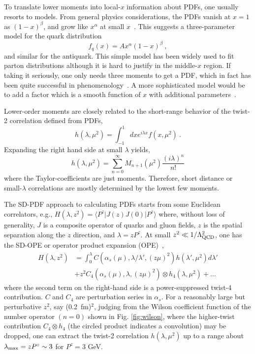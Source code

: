 \documentclass[prd,aps,twocolumn,preprintnumbers,showpacs,nofootinbib,superscriptaddress,notitlepage]{revtex4-2}
\begin{document}
To translate lower moments into local-$x$ information about PDFs, one usually resorts to models. From general 
physics considerations, the PDFs
vanish at $x=1$ as $(1-x)^\beta$, and
grow like $x^\alpha$ at small $x$~\cite{Ioffe:1985ep}. This suggests a  three-parameter model for the quark distribution 
\begin{equation}
   f_q(x) = Ax^\alpha(1-x)^\beta \ , 
\end{equation}
and similar for the antiquark. This simple model has been widely used to fit parton distributions although it is hard to justify  in the middle-$x$ region. If taking it seriously, one only needs three moments to get a PDF, which in fact has been quite successful in phenomenology~\cite{Detmold:2003tm,Alexandrou:2021mmi}. A more sophisticated model would be to add a factor which is a smooth function of $x$ with additional parameters~\cite{Dulat:2015mca}. 

Lower-order moments are closely related to the short-range behavior of the
twist-2 correlation defined from PDFs, 
\begin{equation}
     h(\lambda,\mu^2) = \int^1_{-1} {dx}
     e^{i\lambda x} f(x, \mu^2) \ . 
\end{equation}
Expanding the right hand side at small $\lambda$ yields, 
\begin{equation}
    h(\lambda,\mu^2) = \sum_{n=0}^\infty M_{n+1}(\mu^2) \frac{(i\lambda)^n}{n!}
    \label{eq:expand}
\end{equation}
where the Taylor-coefficients are just moments.
Therefore, short distance or small-$\lambda$ correlations are mostly determined by the lowest
few moments. 

The SD-PDF approach to calculating PDFs starts from some Euclidean correlators, e.g., $H(\lambda, z^2)=\langle P^z| J(z)J(0)|P^z\rangle$ where, without loss of generality, $J$ is a composite operator of quarks and gluon fields, $z$ is the spatial separation along the $z$ direction, and $\lambda = zP^z$. At small $z^2\ll 1/\Lambda_{\rm QCD}^2$, 
one has the SD-OPE or operator product expansion (OPE)~\cite{Braun:2007wv,Ma:2017pxb,Izubuchi:2018srq}, 
\begin{eqnarray}
    H(\lambda, z^2) &= \int^\lambda_0 C(\alpha_s(\mu),\lambda/\lambda',(z\mu)^2) h(\lambda',\mu^2)d\lambda' \nonumber \\ &+ z^2 C_4(\alpha_s(\mu),\lambda,(z\mu)^2)\otimes h_4(\lambda,\mu^2) + ...
    \label{expansion}
\end{eqnarray}
where the second term
on the right-hand side is a power-suppressed twist-4 contribution. $C$ and $C_4$ are perturbation series in $\alpha_s$. 
For a reasonably large but perturbative
$z^2$, say (0.2~fm)$^2$, judging from the Wilson coefficient function of the number operator $(n=0)$ shown in Fig. \ref{fig:wilson}, where the higher-twist contribution $C_4\otimes h_4$ (the circled product indicates a convolution) may be dropped, one can extract the twist-2 correlation $h(\lambda, \mu^2)$
up to a range about $\lambda_{\rm max} = zP^z\sim 3$ for $P^z=3$ GeV. 
\end{document}
